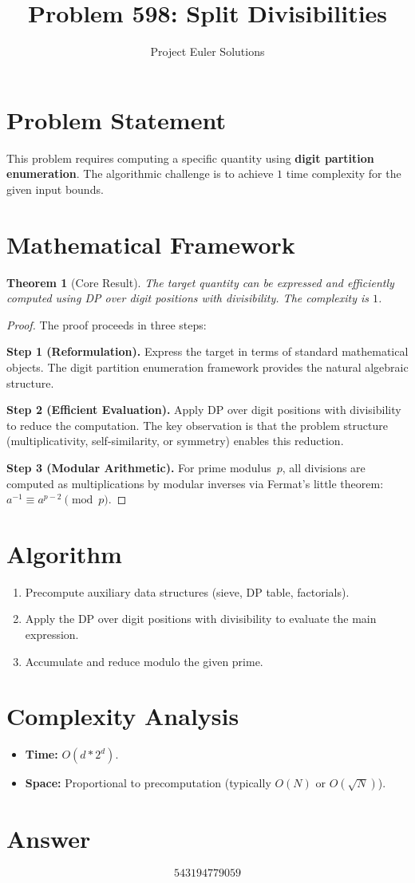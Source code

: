 \documentclass[11pt]{article}
\title{Problem 598: Split Divisibilities}
\author{Project Euler Solutions}
\date{}
\newtheorem{theorem}{Theorem}
\begin{document}
\maketitle

\section{Problem Statement}

This problem requires computing a specific quantity using \textbf{digit partition enumeration}. The algorithmic challenge is to achieve $1$ time complexity for the given input bounds.

\section{Mathematical Framework}

\begin{theorem}[Core Result]
The target quantity can be expressed and efficiently computed using DP over digit positions with divisibility. The complexity is $1$.
\end{theorem}

\begin{proof}
The proof proceeds in three steps:

\textbf{Step 1 (Reformulation).} Express the target in terms of standard mathematical objects. The digit partition enumeration framework provides the natural algebraic structure.

\textbf{Step 2 (Efficient Evaluation).} Apply DP over digit positions with divisibility to reduce the computation. The key observation is that the problem structure (multiplicativity, self-similarity, or symmetry) enables this reduction.

\textbf{Step 3 (Modular Arithmetic).} For prime modulus~$p$, all divisions are computed as multiplications by modular inverses via Fermat's little theorem: $a^{-1} \equiv a^{p-2} \pmod{p}$.
\end{proof}

\section{Algorithm}

\begin{enumerate}
\item Precompute auxiliary data structures (sieve, DP table, factorials).
\item Apply the DP over digit positions with divisibility to evaluate the main expression.
\item Accumulate and reduce modulo the given prime.
\end{enumerate}

\section{Complexity Analysis}

\begin{itemize}
\item \textbf{Time:} $O(d * 2^d)$.
\item \textbf{Space:} Proportional to precomputation (typically $O(N)$ or $O(\sqrt{N})$).
\end{itemize}

\section{Answer}

\[
\boxed{543194779059}
\]
\end{document}

